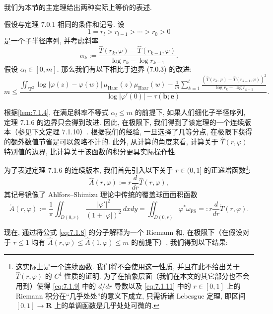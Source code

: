 我们为本节的主定理给出两种实际上等价的表述.

\begin{theorem}\label{thm:7.1.6}
假设与定理 7.0.1 相同的条件和记号. 设
\[ 1 = r_l > r_{l-1} > \cdots > r_0 > 0 \]
是一个子半径序列, 并考虑斜率
\begin{equation}\label{eq:7.1.7}
\alpha_k := \frac{\widehat{T}(r_k, \varphi) - \widehat{T}(r_{k-1}, \varphi)}{\log r_k - \log r_{k-1}}.
\end{equation}
假设 \(\alpha_l \in [0, m]\). 
那么我们有以下相比于边界 (7.0.3) 的改进:
\begin{equation}\label{eq:7.1.8}
m \leq \frac{\iint_{\mathbf{T}^2} \log |\varphi(z) - \varphi(w)| \, \mu_{\mathrm{Haar}}(z) \mu_{\mathrm{Haar}}(w) - \frac{1}{m} \sum_{k=1}^l \frac{\left(\widehat{T}(r_k, \varphi) - \widehat{T}(r_{k-1}, \varphi)\right)^2}{\log r_k - \log r_{k-1}}}{\log |\varphi'(0)| - \tau(\mathbf{b}; \mathbf{e})}.
\end{equation}
\end{theorem}

根据\autoref{lem:7.1.4}, 在满足斜率不等式 \(\alpha_l \leq m\) 的前提下, 
如果人们细化子半径序列, 定理 7.1.6 的边界只会得到改进. 
因此, 在极限下, 我们得到了该定理的一个连续版本（参见下文定理 7.1.10）. 
根据我们的经验, 一旦选择了几等分点, 在极限下获得的额外数值节省是可以忽略不计的. 
此外, 从计算的角度来看, 计算关于 \(\widehat{T}(r,\varphi)\) 特别值的边界, 
比计算关于该函数的积分更具实际操作性.

为了表述定理 7.1.6 的连续版本, 我们首先引入以下关于 \(r \in (0, 1]\) 的正递增函数\footnote{这实际上是一个连续函数. 我们将不会使用这一性质, 并且在此不给出关于 \(\widehat{T}(r,\varphi)\) 的 \(C^1\) 性质的证明. 为了在抽象层面（我们在本文的其它部分也不会用到）使得 \eqref{eq:7.1.9} 中的 \(d/dr\) 导数以及 \eqref{eq:7.1.11} 中的 \(r \in [0,1]\) 上的 Riemann 积分在“几乎处处”的意义下成立, 只需诉诸 Lebesgue 定理, 即区间 \([0,1] \to \mathbf{R}\) 上的单调函数是几乎处处可微的.}:
\begin{equation}\label{eq:7.1.9}
\widehat{A}(r,\varphi) := r \frac{d}{dr} \widehat{T}(r,\varphi),
\end{equation}
其记号镜像了 Ahlfors--Shimizu 理论中传统的覆盖球面面积函数
\[ \mathring{A}(r,\varphi) := \frac{1}{\pi} \iint_{D(0,r)} \frac{|\varphi'|^2}{(1+|\varphi|)^2} \, dx dy = \iint_{D(0,r)} \varphi^* \omega_{\mathrm{FS}} =: r \frac{d}{dr} \mathring{T}(r,\varphi). \]

现在, 通过将公式 \eqref{eq:7.1.8} 的分子解释为一个 Riemann 和, 在极限下（在假设对于 \(r \leq 1\) 均有 \(\widehat{A}(r,\varphi) \leq \widehat{A}(1,\varphi) \leq m\) 的前提下）, 我们得到以下结果:

